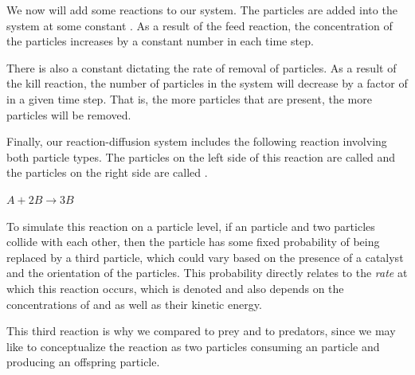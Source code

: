We now will add some reactions to our system. The  particles are added into the system at some constant  . As a result of the feed reaction, the concentration of the  particles increases by a constant number in each time step.\\

\begin{note}\end{note}

There is also a  constant  dictating the rate of removal of  particles. As a result of the kill reaction, the number of  particles in the system will decrease by a factor of  in a given time step. That is, the more  particles that are present, the more  particles will be removed.

Finally, our reaction-diffusion system includes the following reaction involving both particle types. The particles on the left side of this reaction are called  and the particles on the right side are called .

\begin{center}
$A + 2B \rightarrow 3B$
\end{center}

To simulate this reaction on a particle level, if an  particle and two  particles collide with each other, then the  particle has some fixed probability of being replaced by a third  particle, which could vary based on the presence of a catalyst and the orientation of the particles. This probability directly relates to the \textit{rate} at which this reaction occurs, which is denoted  and also depends on the concentrations of  and  as well as their kinetic energy.

This third reaction is why we compared  to prey and  to predators, since we may like to conceptualize the reaction as two  particles consuming an  particle and producing an offspring  particle.


